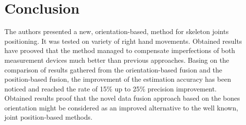 \documentclass[9pt]{llncs}
\begin{document}
\section{Conclusion}
The authors presented a new, orientation-based, method for skeleton joints positioning. It was tested on variety of right hand movements. Obtained results have prooved that the method managed to compensate imperfections of both measurement devices much better than previous approaches. Basing on the comparison of results gathered from the orientation-based fusion and the position-based fusion, the improvement of the estimation accuracy has been noticed and reached the rate of 15\% up to 25\% precision improvement. \\
Obtained results proof that the novel data fusion approach based on the bones orientation might be considered as an improved alternative to the well known, joint position-based methods.
\end{document}
